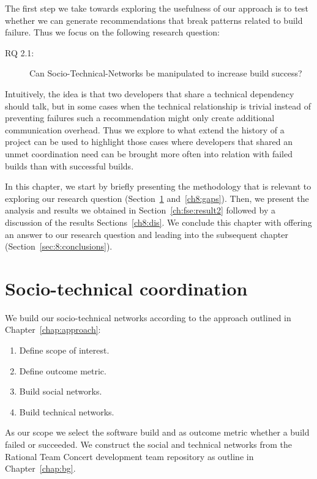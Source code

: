 \label{chap:stc-net}
The first step we take towards exploring the usefulness of our approach is to test whether we can generate recommendations that break patterns related to build failure.
Thus we focus on the following research question:

\begin{description}
  \item[RQ 2.1:] Can Socio-Technical-Networks be manipulated to increase build success? 
\end{description}

Intuitively, the idea is that two developers that share a technical dependency should talk, but in some cases when the technical relationship is trivial instead of preventing failures such a recommendation might only create additional communication overhead.
Thus we explore to what extend the history of a project can be used to highlight those cases where developers that shared an unmet coordination need can be brought more often into relation with failed builds than with successful builds.

In this chapter, we start by briefly presenting the methodology that is relevant to exploring our research question (Section~\ref{sec:data} and~\ref{ch8:gaps}).
Then, we present the analysis and results we obtained in Section~\ref{ch:fse:result2} followed by a discussion of the results Sections~\ref{ch8:dis}.
We conclude this chapter with offering an answer to our research question and leading into the subsequent chapter (Section~\ref{sec:8:conclusions}).


\section{Socio-technical coordination}
\label{sec:data}
We build our socio-technical networks according to the approach outlined in Chapter~\ref{chap:approach}:

\begin{enumerate}
\item Define scope of interest.
\item Define outcome metric.
\item Build social networks.
\item Build technical networks.
\end{enumerate}

As our scope we select the software build and as outcome metric whether a build failed or succeeded.
We construct the social and technical networks from the Rational Team Concert development team repository as outline in Chapter~\ref{chap:bg}.


